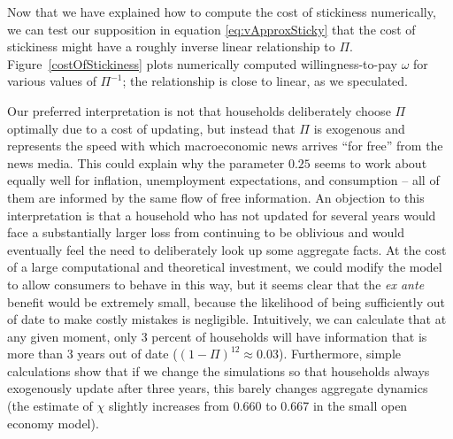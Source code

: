 Now that we have explained how to compute the cost of stickiness numerically, we can test our supposition in equation \eqref{eq:vApproxSticky} that the cost of stickiness might have a roughly inverse linear relationship to $\Pi$.  Figure~\ref{costOfStickiness} plots numerically computed willingness-to-pay $\omega$ for various values of $\Pi^{-1}$; the relationship is close to linear, as we speculated.

Our preferred interpretation is not that households deliberately choose $\Pi$ optimally due to a cost of updating, but instead that $\Pi$ is exogenous and represents the speed with which macroeconomic news arrives ``for free'' from the news media.  This could explain why the parameter $0.25$ seems to work about equally well for inflation, unemployment expectations, and consumption -- all of them are informed by the same flow of free information. An objection to this interpretation is that a household who has not updated for several years would face a substantially larger loss from continuing to be oblivious and would eventually feel the need to deliberately look up some aggregate facts.  At the cost of a large computational and theoretical investment, we could modify the model to allow consumers to behave in this way, but it seems clear that the {\it ex ante} benefit would be extremely small, because the likelihood of being sufficiently out of date to make costly mistakes is negligible.  Intuitively, we can calculate that at any given moment, only 3 percent of households will have information that is more than 3 years out of date ($(1-\Pi)^{12} \approx 0.03$).  Furthermore, simple calculations show that if we change the simulations so that households always exogenously update after three years, this barely changes aggregate dynamics (the estimate of $\chi$ slightly increases from 0.660 to 0.667 in the small open economy model).

